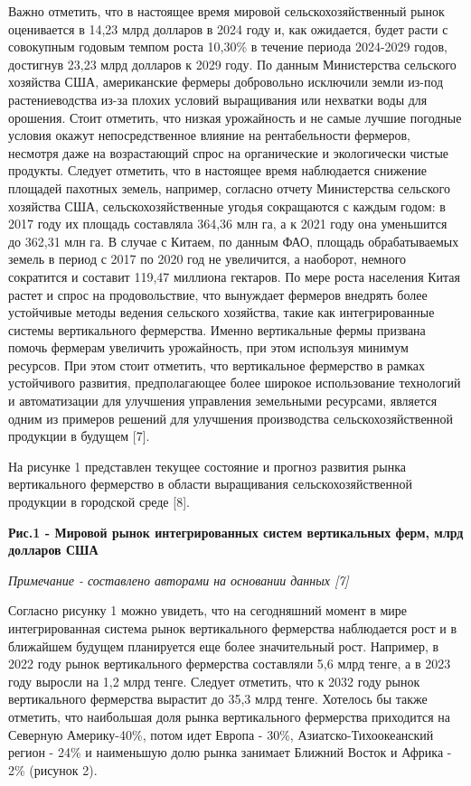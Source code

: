 \begin{multicols}{2}
Важно отметить, что в настоящее время мировой сельскохозяйственный рынок
оценивается в 14,23 млрд долларов в 2024 году и, как ожидается, будет
расти с совокупным годовым темпом роста 10,30\% в течение периода
2024-2029 годов, достигнув 23,23 млрд долларов к 2029 году. По данным
Министерства сельского хозяйства США, американские фермеры добровольно
исключили земли из-под растениеводства из-за плохих условий выращивания
или нехватки воды для орошения. Стоит отметить, что низкая урожайность и
не самые лучшие погодные условия окажут непосредственное влияние на
рентабельности фермеров, несмотря даже на возрастающий спрос на
органические и экологически чистые продукты. Следует отметить, что в
настоящее время наблюдается снижение площадей пахотных земель, например,
согласно отчету Министерства сельского хозяйства США,
сельскохозяйственные угодья сокращаются с каждым годом: в 2017 году их
площадь составляла 364,36 млн га, а к 2021 году она уменьшится до 362,31
млн га. В случае с Китаем, по данным ФАО, площадь обрабатываемых земель
в период с 2017 по 2020 год не увеличится, а наоборот, немного
сократится и составит 119,47 миллиона гектаров. По мере роста населения
Китая растет и спрос на продовольствие, что вынуждает фермеров внедрять
более устойчивые методы ведения сельского хозяйства, такие как
интегрированные системы вертикального фермерства. Именно вертикальные
фермы призвана помочь фермерам увеличить урожайность, при этом используя
минимум ресурсов. При этом стоит отметить, что вертикальное фермерство в
рамках устойчивого развития, предполагающее более широкое использование
технологий и автоматизации для улучшения управления земельными
ресурсами, является одним из примеров решений для улучшения производства
сельскохозяйственной продукции в будущем {[}7{]}.

На рисунке 1 представлен текущее состояние и прогноз развития рынка
вертикального фермерство в области выращивания сельскохозяйственной
продукции в городской среде {[}8{]}.
\end{multicols}

{\bfseries Рис.1 - Мировой рынок интегрированных систем вертикальных ферм, млрд долларов США}

\emph{Примечание - составлено авторами на основании данных {[}7{]}}

\begin{multicols}{2}
Согласно рисунку 1 можно увидеть, что на сегодняшний момент в мире
интегрированная система рынок вертикального фермерства наблюдается рост
и в ближайшем будущем планируется еще более значительный рост. Например,
в 2022 году рынок вертикального фермерства составляли 5,6 млрд тенге, а
в 2023 году выросли на 1,2 млрд тенге. Следует отметить, что к 2032 году
рынок вертикального фермерства вырастит до 35,3 млрд тенге. Хотелось бы
также отметить, что наибольшая доля рынка вертикального фермерства
приходится на Северную Америку-40\%, потом идет Европа - 30\%,
Азиатско-Тихоокеанский регион - 24\% и наименьшую долю рынка занимает
Ближний Восток и Африка - 2\% (рисунок 2).
\end{multicols}

